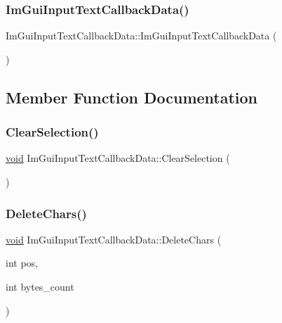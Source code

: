 \subsubsection{\texorpdfstring{Im\+Gui\+Input\+Text\+Callback\+Data()}{ImGuiInputTextCallbackData()}}
{\footnotesize\ttfamily Im\+Gui\+Input\+Text\+Callback\+Data\+::\+Im\+Gui\+Input\+Text\+Callback\+Data (\begin{DoxyParamCaption}{ }\end{DoxyParamCaption})}



\subsection{Member Function Documentation}
\mbox{\label{structImGuiInputTextCallbackData_a14dacdd841c76dfd171ffca8a96d7c22}} 
\subsubsection{\texorpdfstring{Clear\+Selection()}{ClearSelection()}}
{\footnotesize\ttfamily \hyperlink{imgui__impl__opengl3__loader_8h_ac668e7cffd9e2e9cfee428b9b2f34fa7}{void} Im\+Gui\+Input\+Text\+Callback\+Data\+::\+Clear\+Selection (\begin{DoxyParamCaption}{ }\end{DoxyParamCaption})\hspace{0.3cm}{\ttfamily [inline]}}

\mbox{\label{structImGuiInputTextCallbackData_ab5dc30d7edcf60efbd5bb8e677dab8bf}} 
\subsubsection{\texorpdfstring{Delete\+Chars()}{DeleteChars()}}
{\footnotesize\ttfamily \hyperlink{imgui__impl__opengl3__loader_8h_ac668e7cffd9e2e9cfee428b9b2f34fa7}{void} Im\+Gui\+Input\+Text\+Callback\+Data\+::\+Delete\+Chars (\begin{DoxyParamCaption}\item[{int}]{pos,  }\item[{int}]{bytes\+\_\+count }\end{DoxyParamCaption})}

